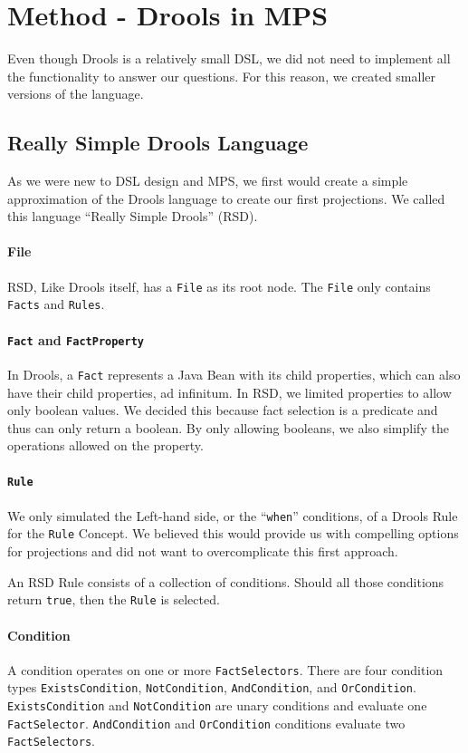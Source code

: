 \section{Method - Drools in MPS}
\label{section:adr_method}

Even though Drools is a relatively small DSL, we did not need to implement all the functionality to answer our questions.
For this reason, we created smaller versions of the language.

\subsection{Really Simple Drools Language}
As we were new to DSL design and MPS, we first would create a simple approximation of the Drools language to create our first projections.
We called this language ``Really Simple Drools'' (RSD).

\paragraph{File} RSD, Like Drools itself, has a \texttt{File} as its root node.
The \texttt{File} only contains \texttt{Facts} and \texttt{Rules}.

\paragraph{\texttt{Fact} and \texttt{FactProperty}} In Drools, a \texttt{Fact} represents a Java Bean with its child properties, which can also have their child properties, ad infinitum.
In RSD, we limited properties to allow only boolean values.
We decided this because fact selection is a predicate and thus can only return a boolean.
By only allowing booleans, we also simplify the operations allowed on the property.

\paragraph{\texttt{Rule}} We only simulated the Left-hand side, or the ``\texttt{when}'' conditions, of a Drools Rule for the \texttt{Rule} Concept.
We believed this would provide us with compelling options for projections and did not want to overcomplicate this first approach.

An RSD Rule consists of a collection of conditions.
Should all those conditions return \texttt{true}, then the \texttt{Rule} is selected.

\paragraph{Condition} A condition operates on one or more \texttt{FactSelectors}.
There are four condition types \texttt{ExistsCondition}, \texttt{NotCondition}, \texttt{AndCondition}, and \texttt{OrCondition}.
\texttt{ExistsCondition} and \texttt{NotCondition} are unary conditions and evaluate one \texttt{FactSelector}.
\texttt{AndCondition} and \texttt{OrCondition} conditions evaluate two \texttt{FactSelectors}.


